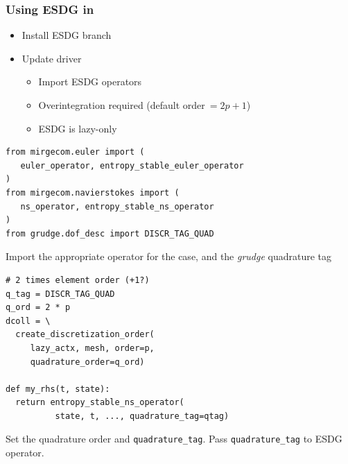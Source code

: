 \begin{frame}[fragile]
  \frametitle{Using ESDG in \mirgecom{}}
  \begin{minipage}[b]{0.48\textwidth}
    \begin{itemize}
      \item Install \mirgecom{} ESDG branch
      \item Update \mirgecom{} driver
      \begin{itemize}
        \item Import ESDG operators
        \item Overintegration required (default order$~=\!2p\!+\!1$)
        \item ESDG is lazy-only
      \end{itemize}
    \end{itemize}
  \end{minipage}\hfill
  \begin{minipage}[b]{0.48\textwidth}
    \centering
\begin{lstlisting}
from mirgecom.euler import (
   euler_operator, entropy_stable_euler_operator
)
from mirgecom.navierstokes import (
   ns_operator, entropy_stable_ns_operator
)
from grudge.dof_desc import DISCR_TAG_QUAD
\end{lstlisting}
    \tiny Import the appropriate operator for the case, and the \textit{grudge} quadrature tag
\begin{lstlisting}
# 2 times element order (+1?)
q_tag = DISCR_TAG_QUAD
q_ord = 2 * p
dcoll = \
  create_discretization_order(
     lazy_actx, mesh, order=p,
     quadrature_order=q_ord)

def my_rhs(t, state):
  return entropy_stable_ns_operator(
          state, t, ..., quadrature_tag=qtag)
\end{lstlisting}
    \tiny Set the quadrature order and \texttt{quadrature\_tag}. Pass \texttt{quadrature\_tag} to ESDG operator.
  \end{minipage}
\end{frame}

